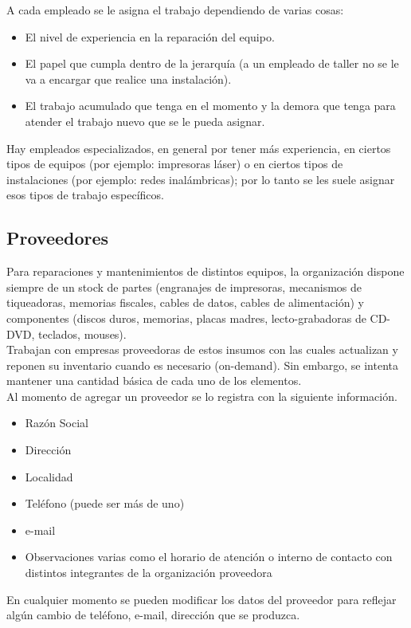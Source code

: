 \documentclass[12pt]{extarticle}
\begin{document}
\begin{spacing}{1.2}
    A cada empleado se le asigna el trabajo dependiendo de varias cosas:
    \begin{itemize}
        \item El nivel de experiencia en la reparación del equipo.
        \item El papel que cumpla dentro de la jerarquía (a un empleado de taller no se le va a encargar que realice una instalación).
        \item El trabajo acumulado que tenga en el momento y la demora que tenga para atender el trabajo nuevo que se le pueda asignar. 
    \end{itemize}

    Hay empleados especializados, en general por tener más experiencia, en ciertos tipos de equipos (por ejemplo: impresoras láser) o en ciertos tipos de instalaciones (por ejemplo: redes inalámbricas); por lo tanto se les suele asignar esos tipos de trabajo específicos.

    \pagebreak
    \subsection{Proveedores}
    Para reparaciones y mantenimientos de distintos equipos, la organización dispone siempre de un stock de partes (engranajes de impresoras, mecanismos de tiqueadoras, memorias fiscales, cables de datos, cables de alimentación) y componentes (discos duros, memorias, placas madres, lecto-grabadoras de CD-DVD, teclados, mouses).\\

    Trabajan con empresas proveedoras de estos insumos con las cuales actualizan y reponen su inventario cuando es necesario (on-demand). Sin embargo, se intenta mantener una cantidad básica de cada uno de los elementos.\\

    Al momento de agregar un proveedor se lo registra con la siguiente información.
        \begin{itemize}
            \item Razón Social
            \item Dirección
            \item Localidad
            \item Teléfono (puede ser más de uno)
            \item e-mail
            \item Observaciones varias como el horario de atención o interno de contacto con distintos integrantes de la organización proveedora
        \end{itemize}
    En cualquier momento se pueden modificar los datos del proveedor para reflejar algún cambio de teléfono, e-mail, dirección que se produzca.


\end{spacing}
\end{document}
